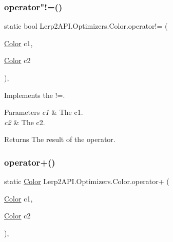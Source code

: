 \subsubsection{\texorpdfstring{operator"!=()}{operator!=()}}
{\footnotesize\ttfamily static bool Lerp2\+A\+P\+I.\+Optimizers.\+Color.\+operator!= (\begin{DoxyParamCaption}\item[{\hyperlink{struct_lerp2_a_p_i_1_1_optimizers_1_1_color}{Color}}]{c1,  }\item[{\hyperlink{struct_lerp2_a_p_i_1_1_optimizers_1_1_color}{Color}}]{c2 }\end{DoxyParamCaption})\hspace{0.3cm}{\ttfamily [inline]}, {\ttfamily [static]}}



Implements the !=. 


\begin{DoxyParams}{Parameters}
{\em c1} & The c1.\\
\hline
{\em c2} & The c2.\\
\hline
\end{DoxyParams}
\begin{DoxyReturn}{Returns}
The result of the operator.
\end{DoxyReturn}
\mbox{\label{struct_lerp2_a_p_i_1_1_optimizers_1_1_color_ac45038b10bb655fe92153ee7f52389b4}} 
\subsubsection{\texorpdfstring{operator+()}{operator+()}}
{\footnotesize\ttfamily static \hyperlink{struct_lerp2_a_p_i_1_1_optimizers_1_1_color}{Color} Lerp2\+A\+P\+I.\+Optimizers.\+Color.\+operator+ (\begin{DoxyParamCaption}\item[{\hyperlink{struct_lerp2_a_p_i_1_1_optimizers_1_1_color}{Color}}]{c1,  }\item[{\hyperlink{struct_lerp2_a_p_i_1_1_optimizers_1_1_color}{Color}}]{c2 }\end{DoxyParamCaption})\hspace{0.3cm}{\ttfamily [inline]}, {\ttfamily [static]}}



